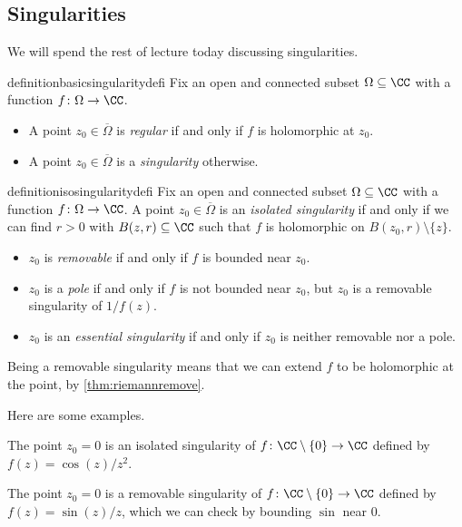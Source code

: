 \documentclass[../notes.tex]{subfiles}
\begin{document}
\subsection{Singularities}
We will spend the rest of lecture today discussing singularities.
\begin{restatable}{definition}{basicsingularitydefi}
	Fix an open and connected subset $\Omega\subseteq\CC$ with a function $f\colon \Omega\to\CC$.
	\begin{itemize}
		\item A point $z_0\in\overline\Omega$ is \textit{regular} if and only if $f$ is holomorphic at $z_0$.
		\item A point $z_0\in\overline\Omega$ is a \textit{singularity} otherwise.
	\end{itemize}
\end{restatable}
\begin{restatable}{definition}{isosingularitydefi}   
	Fix an open and connected subset $\Omega\subseteq\CC$ with a function $f\colon \Omega\to\CC$. A point $z_0\in\overline\Omega$ is an \textit{isolated singularity} if and only if we can find $r>0$ with $B(z,r)\subseteq\CC$ such that $f$ is holomorphic on $B(z_0,r)\setminus\{z\}$.
	\begin{itemize}
		\item $z_0$ is \textit{removable} if and only if $f$ is bounded near $z_0$.
		\item $z_0$ is a \textit{pole} if and only if $f$ is not bounded near $z_0$, but $z_0$ is a removable singularity of $1/f(z)$.
		\item $z_0$ is an \textit{essential singularity} if and only if $z_0$ is neither removable nor a pole.
	\end{itemize}
\end{restatable}
\begin{remark}
	Being a removable singularity means that we can extend $f$ to be holomorphic at the point, by \autoref{thm:riemannremove}.
\end{remark}
Here are some examples.
\begin{example}
	The point $z_0=0$ is an isolated singularity of $f\colon \CC\setminus\{0\}\to\CC$ defined by $f(z)=\cos(z)/z^2$.
\end{example}
\begin{example}
	The point $z_0=0$ is a removable singularity of $f\colon \CC\setminus\{0\}\to\CC$ defined by $f(z)=\sin(z)/z$, which we can check by bounding $\sin$ near $0$.
\end{example}
\end{document}
